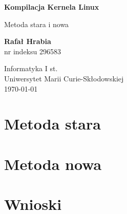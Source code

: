 \documentclass[a4paper,12pt,oneside]{book} %
\begin{document}
\sloppy
\thispagestyle{empty}
\begin{titlepage}
	\begin{center}
		\vspace*{1cm}
		
		\Huge
		\textbf{Kompilacja Kernela Linux}
		
		\vspace{0.5cm}
		\LARGE
		Metoda stara i nowa
		
		\vspace{1.5cm}
		
		\textbf{Rafał Hrabia}\\
		\small nr indeksu 296583
		
		\vfill
		
		\vspace{0.8cm}
		
		\Large
		Informatyka I st.\\
		Uniwersytet Marii Curie-Skłodowskiej\\
		\today
		
	\end{center}
\end{titlepage}
\newpage{}

\thispagestyle{empty}
\newpage{}

\tableofcontents{}

\chapter{Metoda stara}
\label{Metoda stara}



\chapter{Metoda nowa}
\label{Metoda nowa}

\chapter{Wnioski}
\label{Wnioski}



\end{document}
